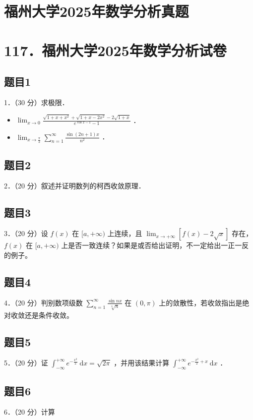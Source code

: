 \documentclass{article}
\begin{document}
\section*{福州大学2025年数学分析真题}
\section*{117．福州大学2025年数学分析试卷}

\subsection{题目1}
1．（30 分）求极限．

\begin{itemize}
  \item[（1）] \(\lim _{x \rightarrow 0} \frac{\sqrt{1+x+x^{2}}+\sqrt{1+x-2 x^{2}}-2 \sqrt{1+x}}{e^{\cos x-1}-1}\) ．
  \item[（2）] \(\lim _{x \rightarrow \frac{\pi}{2}} \sum_{n=1}^{\infty} \frac{\sin (2 n+1) x}{n^{2}}\) ．
\end{itemize}

\subsection{题目2}
2．（20 分）叙述并证明数列的柯西收敛原理．

\subsection{题目3}
3．（20 分）设 \(f(x)\) 在 \([a,+\infty)\) 上连续，且 \(\lim _{x \rightarrow+\infty}[f(x)-2 \sqrt{x}]\) 存在，\(f(x)\) 在 \([a,+\infty)\) 上是否一致连续？如果是或否给出证明，不一定给出一正一反的例子。

\subsection{题目4}
4．（20 分）判别数项级数 \(\sum_{n=1}^{\infty} \frac{\sin n x}{\sqrt[4]{n}}\) 在 \((0, \pi)\) 上的敛散性，若收敛指出是绝对收敛还是条件收敛。

\subsection{题目5}
5．（20 分）证 \(\int_{-\infty}^{+\infty} e^{-\frac{x^{2}}{2}} \mathrm{~d} x=\sqrt{2 \pi}\) ，并用该结果计算 \(\int_{-\infty}^{+\infty} e^{-\frac{x^{2}}{2}+x} \mathrm{~d} x\) ．

\subsection{题目6}
6．（20 分）计算
\end{document}
